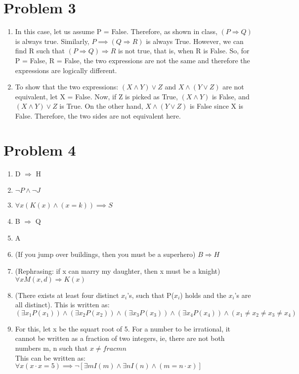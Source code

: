 \documentclass[english]{article}
\begin{document}
\section*{Problem 3}
\begin{enumerate} [label=\alph*]
	\item In this case, let us assume P = False. Therefore, as shown in class, $ (P \Rightarrow Q ) $ is always true. Similarly, $P \implies ( Q \Rightarrow R )$ is always True. However, we can find R such that $ (P \Rightarrow Q) \Rightarrow R  $ is not true, that is, when R is False. So, for P = False, R = False, the two expressions are not the same and therefore the expressions are logically different. 
	\item To show that the two expressions: $ (X \land Y) \lor Z $ and $ X \land (Y \lor Z)$ are not equivalent, let X = False. Now, if Z is picked as True, $ (X \land Y) $ is False, and $ (X \land Y) \lor Z $ is True. On the other hand, $ X \land (Y \lor Z)$ is False since X is False. Therefore, the two sides are not equivalent here. 
\end{enumerate}
\section*{Problem 4}
\begin{enumerate} [label=\alph*]
	\item D $\Rightarrow$ H
	\item $\lnot P \land \lnot J$
	\item  $\forall x (K(x) \land (x = k) ) \implies S $%
	\item B $\Rightarrow$ Q
	\item A
	\item (If you jump over buildings, then you must be a superhero) $ B \Rightarrow H$
	\item (Rephrasing: if x can marry my daughter, then x must be a knight) $ \forall x M(x,d) \Rightarrow K(x)$
	\item (There exists at least four distinct $x_i$'s, such that P($x_i$) holds and the $x_i$'s are all distinct). This is written as: $(\exists x_1 P(x_1)) \land (\exists x_2 P(x_2)) \land (\exists x_3 P(x_3)) \land (\exists x_4 P(x_4)) \land (x_1 \neq x_2 \neq x_3 \neq x_4) $
	\item For this, let x be the squart root of 5. For a number to be irrational, it cannot be written as a fraction of two integers, ie, there are not both numbers m, n such that $ x \neq frac{m}{n} $ \\ This can be written as: $\forall x (x \cdot x = 5) \implies \lnot [\exists m I(m) \land  \exists n I(n) \land (m = n \cdot x)] $

\end{enumerate}
\end{document}
